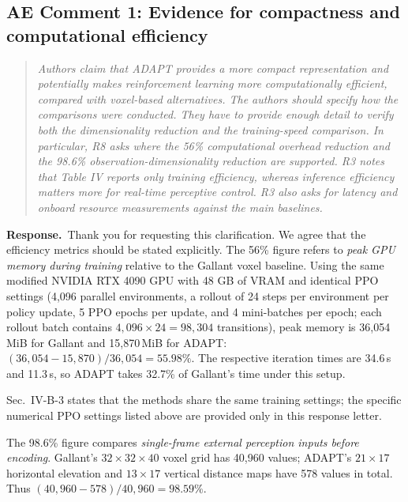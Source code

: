\documentclass[11pt]{article}
\newenvironment{reviewcomment}{\begin{quote}\color{reviewblue}\itshape}{\end{quote}}
\newcommand{\Response}{\par\noindent\textbf{Response.}\ }
\begin{document}
\subsection*{AE Comment 1: Evidence for compactness and computational efficiency}
\begin{reviewcomment}
Authors claim that ADAPT provides a more compact representation and potentially makes reinforcement learning more computationally efficient, compared with voxel-based alternatives. The authors should specify how the comparisons were conducted. They have to provide enough detail to verify both the dimensionality reduction and the training-speed comparison. In particular, R8 asks where the 56\% computational overhead reduction and the 98.6\% observation-dimensionality reduction are supported. R3 notes that Table IV reports only training efficiency, whereas inference efficiency matters more for real-time perceptive control. R3 also asks for latency and onboard resource measurements against the main baselines.
\end{reviewcomment}
\Response Thank you for requesting this clarification. We agree that the efficiency metrics should be stated explicitly. The 56\% figure refers to \emph{peak GPU memory during training} relative to the Gallant voxel baseline. Using the same modified NVIDIA RTX 4090 GPU with 48 GB of VRAM and identical PPO settings (4,096 parallel environments, a rollout of 24 steps per environment per policy update, 5 PPO epochs per update, and 4 mini-batches per epoch; each rollout batch contains $4{,}096\times24=98{,}304$ transitions), peak memory is 36,054\,MiB for Gallant and 15,870\,MiB for ADAPT: $(36{,}054-15{,}870)/36{,}054=55.98\%$. The respective iteration times are 34.6\,s and 11.3\,s, so ADAPT takes 32.7\% of Gallant's time under this setup.

Sec.~IV-B-3 states that the methods share the same training settings; the specific numerical PPO settings listed above are provided only in this response letter.

The 98.6\% figure compares \emph{single-frame external perception inputs before encoding}. Gallant's $32\times32\times40$ voxel grid has 40,960 values; ADAPT's $21\times17$ horizontal elevation and $13\times17$ vertical distance maps have 578 values in total. Thus $(40{,}960-578)/40{,}960=98.59\%$.
\end{document}
